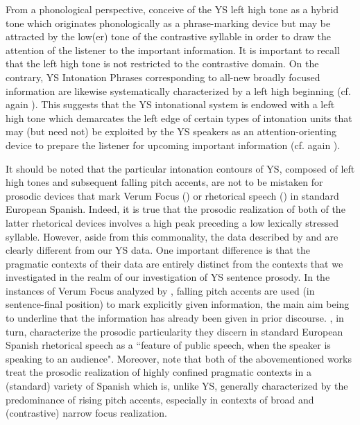 \documentclass[output=paper]{langsci/langscibook}
\begin{document}
From a phonological perspective, \citet{GriceUth15} conceive of the YS left high tone as a hybrid tone which originates phonologically as a phrase-marking device but may be attracted by the low(er) tone of the contrastive syllable in order to draw the attention of the listener to the important information. It is important to recall that the left high tone is not restricted to the contrastive domain. On the contrary, YS Intonation Phrases corresponding to all-new broadly focused information are likewise systematically characterized by a left high beginning (cf. again \citealt{Uth16}). This suggests that the YS intonational system is endowed with a left high tone which demarcates the left edge of certain types of intonation units that may (but need not) be exploited by the YS speakers as an attention-orienting device to prepare the listener for upcoming important information (cf. again \citealt{GriceUth15}). 

It should be noted that the particular intonation contours of YS, composed of left high tones and subsequent falling pitch accents, are not to be mistaken for prosodic devices that mark Verum Focus (\citealt{EscandellVidal11}) or rhetorical speech (\citealt{HualdeNadeu13}) in standard European Spanish. Indeed, it is true that the prosodic realization of both of the latter rhetorical devices involves a high peak preceding a low lexically stressed syllable. However, aside from this commonality, the data described by \citet{EscandellVidal11} and \citet{HualdeNadeu13} are clearly different from our YS data. One important difference is that the pragmatic contexts of their data are entirely distinct from the contexts that we investigated in the realm of our investigation of YS sentence prosody. In the instances of Verum Focus analyzed by \citet{EscandellVidal11}, falling pitch accents are used (in sentence-final position) to mark explicitly given information, the main aim being to underline that the information has already been given in prior discourse.  \citet[231]{HualdeNadeu13}, in turn, characterize the prosodic particularity they discern in standard European Spanish rhetorical speech as a ``feature of public speech, when the speaker is speaking to an audience". Moreover, note that both of the abovementioned works treat the prosodic realization of highly confined pragmatic contexts in a (standard) variety of Spanish which is, unlike YS, generally characterized by the predominance of rising pitch accents, especially in contexts of broad and (contrastive) narrow focus realization.
\end{document}
